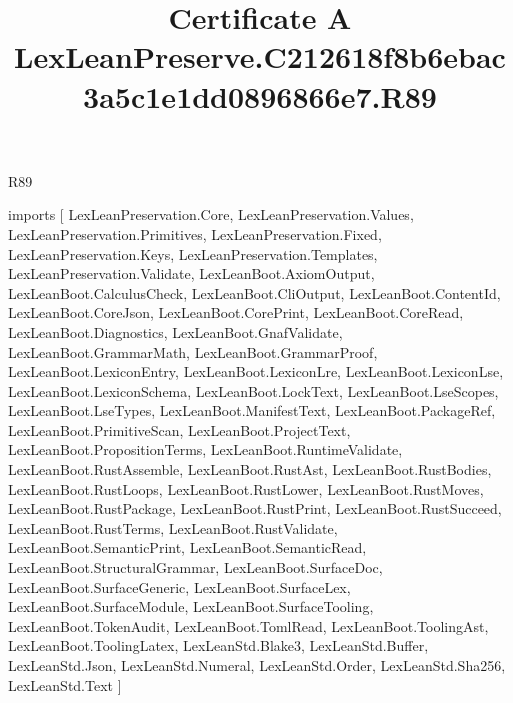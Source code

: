 \begin{lexlean}{R89}
\title{Certificate A LexLeanPreserve.C212618f8b6ebac3a5c1e1dd0896866e7.R89}
\begin{coremodule}
imports [
  LexLeanPreservation.Core,
  LexLeanPreservation.Values,
  LexLeanPreservation.Primitives,
  LexLeanPreservation.Fixed,
  LexLeanPreservation.Keys,
  LexLeanPreservation.Templates,
  LexLeanPreservation.Validate,
  LexLeanBoot.AxiomOutput,
  LexLeanBoot.CalculusCheck,
  LexLeanBoot.CliOutput,
  LexLeanBoot.ContentId,
  LexLeanBoot.CoreJson,
  LexLeanBoot.CorePrint,
  LexLeanBoot.CoreRead,
  LexLeanBoot.Diagnostics,
  LexLeanBoot.GnafValidate,
  LexLeanBoot.GrammarMath,
  LexLeanBoot.GrammarProof,
  LexLeanBoot.LexiconEntry,
  LexLeanBoot.LexiconLre,
  LexLeanBoot.LexiconLse,
  LexLeanBoot.LexiconSchema,
  LexLeanBoot.LockText,
  LexLeanBoot.LseScopes,
  LexLeanBoot.LseTypes,
  LexLeanBoot.ManifestText,
  LexLeanBoot.PackageRef,
  LexLeanBoot.PrimitiveScan,
  LexLeanBoot.ProjectText,
  LexLeanBoot.PropositionTerms,
  LexLeanBoot.RuntimeValidate,
  LexLeanBoot.RustAssemble,
  LexLeanBoot.RustAst,
  LexLeanBoot.RustBodies,
  LexLeanBoot.RustLoops,
  LexLeanBoot.RustLower,
  LexLeanBoot.RustMoves,
  LexLeanBoot.RustPackage,
  LexLeanBoot.RustPrint,
  LexLeanBoot.RustSucceed,
  LexLeanBoot.RustTerms,
  LexLeanBoot.RustValidate,
  LexLeanBoot.SemanticPrint,
  LexLeanBoot.SemanticRead,
  LexLeanBoot.StructuralGrammar,
  LexLeanBoot.SurfaceDoc,
  LexLeanBoot.SurfaceGeneric,
  LexLeanBoot.SurfaceLex,
  LexLeanBoot.SurfaceModule,
  LexLeanBoot.SurfaceTooling,
  LexLeanBoot.TokenAudit,
  LexLeanBoot.TomlRead,
  LexLeanBoot.ToolingAst,
  LexLeanBoot.ToolingLatex,
  LexLeanStd.Blake3,
  LexLeanStd.Buffer,
  LexLeanStd.Json,
  LexLeanStd.Numeral,
  LexLeanStd.Order,
  LexLeanStd.Sha256,
  LexLeanStd.Text
]


\end{coremodule}
\end{lexlean}
